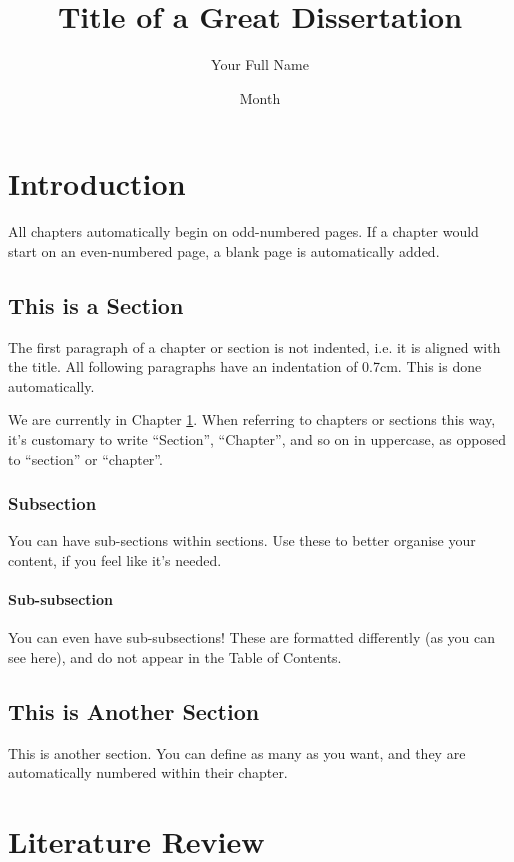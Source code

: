 \documentclass[12pt,reqno,twoside]{amsbook}
\title{Title of a Great Dissertation}
\author{Your Full Name}
\date{Month}{Year}
\begin{document}
\chapter{Introduction}\label{ch:introduction}
All chapters automatically begin on odd-numbered pages. If a chapter would start on an even-numbered page, a blank page is automatically added.

\section{This is a Section}\label{sec:example_section}
The first paragraph of a chapter or section is not indented, i.e. it is aligned with the title. All following paragraphs have an indentation of 0.7cm. This is done automatically.

We are currently in Chapter \ref{ch:introduction}. When referring to chapters or sections this way, it's customary to write ``Section'', ``Chapter'', and so on in uppercase, as opposed to ``section'' or ``chapter''.

\subsection{Subsection}
You can have sub-sections within sections. Use these to better organise your content, if you feel like it's needed.

\subsubsection{Sub-subsection}
You can even have sub-subsections! These are formatted differently (as you can see here), and do not appear in the Table of Contents.

\section{This is Another Section}

This is another section. You can define as many as you want, and they are automatically numbered within their chapter.










\chapter{Literature Review}\label{ch:literature_review}
\end{document}

